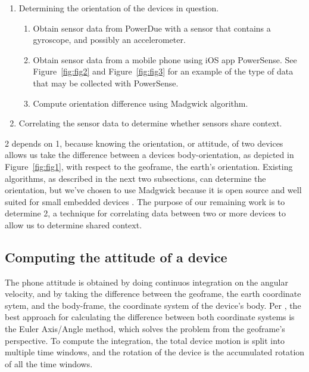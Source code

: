 \documentclass[journal]{IEEEtranTIE}
\begin{document}
\begin{enumerate}
\item Determining the orientation of the devices in question.
\begin{enumerate}
\item Obtain sensor data from PowerDue with a sensor that contains a gyroscope,
      and possibly an accelerometer.
\item Obtain sensor data from a mobile phone using iOS app PowerSense. See
      Figure~\ref{fig:fig2} and Figure~\ref{fig:fig3} for an example of the type
      of data that may be collected with PowerSense.
\item Compute orientation difference using Madgwick algorithm.
\end{enumerate}
\item Correlating the sensor data to determine whether sensors share context.
\end{enumerate}

2 depends on 1, because knowing the orientation, or attitude, of two devices
allows us take the difference between a devices body-orientation, as depicted in
Figure~\ref{fig:fig1}, with respect to the geoframe, the earth's orientation. Existing
algorithms, as described in the next two subsections, can determine the
orientation, but we've chosen to use Madgwick because it is open source and well
suited for small embedded devices \cite{Madgwick}. The purpose of our remaining
work is to determine 2, a technique for correlating data between two or more
devices to allow us to determine shared context.

\subsection{Computing the attitude of a device}

The phone attitude is obtained by doing continuos integration on the angular
velocity, and by taking the difference between the geoframe, the earth
coordinate sytem, and the body-frame, the coordinate system of the device's
body. Per \cite{PhoneAttitude}, the best approach for calculating the difference
between both coordinate systems is the Euler Axis/Angle method, which solves the
problem from the geoframe's perspective. To compute the integration, the total
device motion is split into multiple time windows, and the rotation of the
device is the accumulated rotation of all the time windows.
\end{document}
